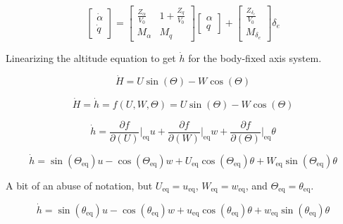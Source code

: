 \begin{equation*}
  \begin{bmatrix}
    \dot{\alpha} \\
    \dot{q}
  \end{bmatrix}=
  \begin{bmatrix}
    \frac{Z_{\alpha}}{V_{0}} & 1+\frac{Z_{q}}{V_{0}} \\
    M_{\alpha} & M_{q}
  \end{bmatrix}
  \begin{bmatrix}
    \alpha \\
    q
  \end{bmatrix}+
  \begin{bmatrix}
    \frac{Z_{\delta_{e}}}{V_{0}} \\
    M_{\delta_{e}}
  \end{bmatrix}
  \delta_{e}
\end{equation*}

Linearizing the altitude equation to get $\dot{h}$ for the body-fixed axis system.

\begin{equation*}
  \dot{H} = U\sin(\Theta)-W\cos(\Theta)
\end{equation*}

\begin{equation*}
  \dot{H} = \dot{h} = f(U, W, \Theta) = U\sin(\Theta)-W\cos(\Theta)
\end{equation*}

\begin{equation*}
  \dot{h} = \frac{\partial{}f}{\partial{}(U)}\biggr|_{\text{eq}}u + \frac{\partial{}f}{\partial{}(W)}\biggr|_{\text{eq}}w + \frac{\partial{}f}{\partial{}(\Theta)}\biggr|_{\text{eq}}\theta
\end{equation*}

\begin{equation*}
  \dot{h} = \sin(\Theta_{\text{eq}})u - \cos(\Theta_{\text{eq}})w + U_{\text{eq}}\cos(\Theta_{\text{eq}})\theta + W_{\text{eq}}\sin(\Theta_{\text{eq}})\theta
\end{equation*}

A bit of an abuse of notation, but $U_{\text{eq}} = u_{\text{eq}}$, $W_{\text{eq}} = w_{\text{eq}}$, and $\Theta_{\text{eq}} = \theta_{\text{eq}}$.

\begin{equation*}
  \dot{h} = \sin(\theta_{\text{eq}})u - \cos(\theta_{\text{eq}})w + u_{\text{eq}}\cos(\theta_{\text{eq}})\theta + w_{\text{eq}}\sin(\theta_{\text{eq}})\theta
\end{equation*}


